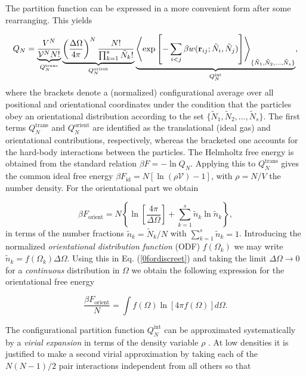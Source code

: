 {The partition function can be expressed in a more convenient form after some rearranging. This yields

\begin{equation}
Q_{N}= \underbrace{\frac{V^{N}}{\mathcal{V} ^{N} N!}}_{Q_{N}^{\text{trans}}}
\underbrace{\left(\frac{\Delta \Omega}{4\pi}\right)^{N}
\frac{N!}{\prod_{k=1}^{s}\tilde{N}_{k}!}}_{Q_{N}^{\text{orient}}}
\underbrace{\left < \exp\left[-\sum_{i<j}\beta w({\bf r}_{ij};
\tilde{N}_{i},\tilde{N}_{j})\right] \right >_{\{\tilde{N}_{1},\tilde{N}_{2},\ldots,\tilde{N}_{s}\}}
}_{Q_{N}^{\text{int}}},
\end{equation}
where the brackets denote a (normalized) configurational average over all positional and orientational coordinates under the condition that the particles obey an orientational distribution according to the set $\{\tilde{N}_{1},\tilde{N}_{2},\ldots,\tilde{N}_{s}\}$. The first terms $Q_{N}^{\text{trans}}$ and $Q_{N}^{\text{orient}}$ are  identified as the translational (ideal gas) and orientational contributions, respectively, whereas the bracketed one accounts for the hard-body interactions between the particles. The Helmholtz free energy is obtained from the standard relation $\beta F= -\ln Q_{N}$. Applying this to $Q_{N}^{\text{trans}}$ gives the common ideal free energy $\beta F_{\text{id}}= N\left[\ln (\rho \mathcal{V})-1\right]$, with $\rho=N/V$ the number density.
For the orientational part we obtain

\begin{equation}
\beta F_{\text{orient}}=N\left\{\ln \left[\frac{4\pi}{\Delta \Omega}\right] + \sum_{k=1}^{s}\tilde{n}_{k}\ln \tilde{n}_{k} \right\},
\label{0fordiscreet}
\end{equation}
in terms of the number fractions $\tilde{n}_{k}=\tilde{N}_{k}/N$ with $\sum_{k=1}^{s}\tilde{n}_{k}=1$. Introducing the normalized {\em orientational distribution function} (ODF) $f(\Omega_{k})$ we may write $\tilde{n}_{k}=f(\Omega_{k})\Delta\Omega$. Using this in Eq. (\ref{0fordiscreet}) and taking the  limit $\Delta \Omega \rightarrow 0$ for a {\em continuous} distribution in $\Omega$ we obtain the following expression for the orientational free energy

\begin{equation}
\frac{\beta F_{\text{orient}}}{N}=\int f(\Omega)\ln \left[4\pi f(\Omega)\right]d\Omega.
\label{0forient}
\end{equation}

The configurational partition function  $Q_{N}^{\text{int}}$ can be approximated systematically by a {\em virial expansion} in terms of the density variable $\rho$ \cite{hansenmacdonald}. At low densities it is justified to make a second virial approximation   by taking each of the $N(N-1)/2$ pair interactions independent from all others so that

}

